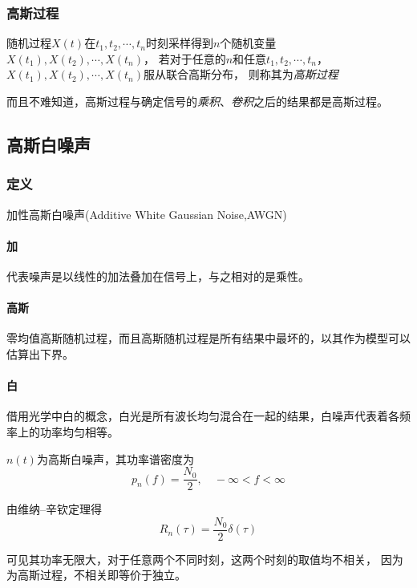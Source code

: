     \subsubsection{高斯过程}
    随机过程$X(t)$在$t_1,t_2,\cdots,t_n$时刻采样得到$n$个随机变量$X(t_1),X(t_2),\cdots,X(t_n)$，
    若对于任意的$n$和任意$t_1,t_2,\cdots,t_n$，$X(t_1),X(t_2),\cdots,X(t_n)$服从联合高斯分布，
    则称其为\emph{高斯过程}

    而且不难知道，高斯过程与确定信号的\emph{乘积}、\emph{卷积}之后的结果都是高斯过程。
    
\subsection{高斯白噪声}
    \subsubsection{定义}
    加性高斯白噪声(Additive White Gaussian Noise,AWGN)
    
    \paragraph{加}代表噪声是以线性的加法叠加在信号上，与之相对的是乘性。

    \paragraph{高斯}零均值高斯随机过程，而且高斯随机过程是所有结果中最坏的，以其作为模型可以估算出下界。

    \paragraph{白}借用光学中白的概念，白光是所有波长均匀混合在一起的结果，白噪声代表着各频率上的功率均匀相等。

    $n(t)$为高斯白噪声，其功率谱密度为
    \begin{equation}
        p_n(f)=\frac{N_0}{2},\hspace{1em}-\infty<f<\infty
    \end{equation}
    
    由维纳--辛钦定理得
    \begin{equation}
        R_n(\tau)=\frac{N_0}{2}\delta(\tau)
    \end{equation}
    
    可见其功率无限大，对于任意两个不同时刻，这两个时刻的取值均不相关，
    因为为高斯过程，不相关即等价于独立。

